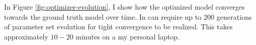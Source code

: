 In Figure \ref{fig:optimizer-evolution}, I show how the optimized model converges towards the ground truth model over time.
In can require up to $200$ generations of parameter set evolution for tight convergence to be realized.
This takes approximately $10-20$ minutes on a my personal laptop.



